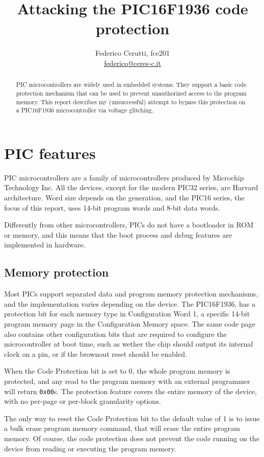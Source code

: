 \documentclass[a4paper,english,twoside,10pt]{article}
\title{Attacking the PIC16F1936 code protection}
\author{Federico Cerutti, fce201 \\\href{mailto:federico@ceres-c.it}{federico@ceres-c.it}}
\begin{document}
\maketitle%

\begin{abstract}
	PIC microcontrollers are widely used in embedded systems. They support a basic code protection mechanism that can be used to prevent unauthorized access to the program memory. This report describes my (unsuccessful) attempt to bypass this protection on a PIC16F1936 microcontroller via voltage glitching.
\end{abstract}



\section{PIC features}\label{sec:picfeatures}
PIC microcontrollers are a family of microcontrollers produced by Microchip Technology Inc. All the devices, except for the modern PIC32 series, are Harvard architecture. Word size depends on the generation, and the PIC16 series, the focus of this report, uses 14-bit program words and 8-bit data words.

Differently from other microcontrollers, PICs do not have a bootloader in ROM or memory, and this means that the boot process and debug features are implemented in hardware.

\subsection{Memory protection}\label{sec:memoryprotection}
Most PICs support separated data and program memory protection mechanisms, and the implementation varies depending on the device. The PIC16F1936, has a protection bit for each memory type in Configuration Word 1, a specific 14-bit program memory page in the Configuration Memory space. The same code page also contains other configuration bits that are required to configure the microcontroller at boot time, such as wether the chip should output its internal clock on a pin, or if the brownout reset should be enabled.

When the Code Protection bit is set to 0, the whole program memory is protected, and any read to the program memory with an external programmer will return \texttt{0x00}s. The protection feature covers the entire memory of the device, with no per-page or per-block granularity options.

The only way to reset the Code Protection bit to the default value of 1 is to issue a bulk erase program memory command, that will erase the entire program memory. Of course, the code protection does not prevent the code running on the device from reading or executing the program memory.
\end{document}
